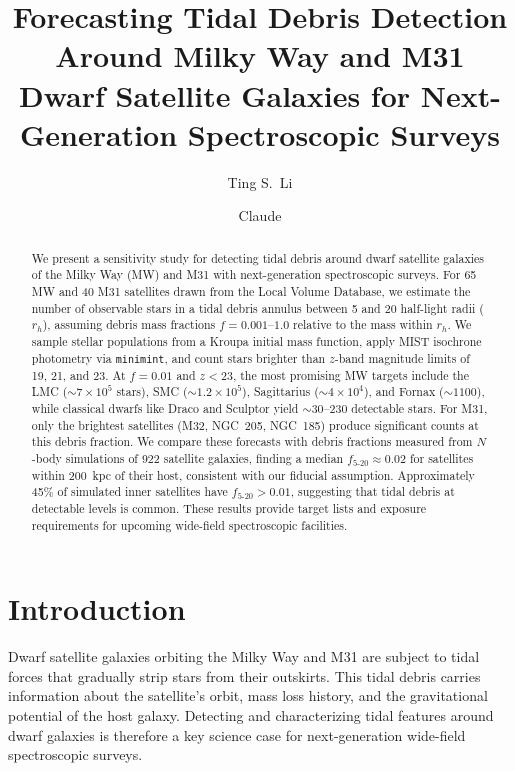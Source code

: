 \documentclass[twocolumn]{aastex63}
\begin{document}
\title{Forecasting Tidal Debris Detection Around Milky Way and M31 Dwarf Satellite Galaxies for Next-Generation Spectroscopic Surveys}

\author{Ting S.\ Li}

\author{Claude}

\begin{abstract}
We present a sensitivity study for detecting tidal debris around dwarf satellite galaxies of the Milky Way (MW) and M31 with next-generation spectroscopic surveys. For 65 MW and 40 M31 satellites drawn from the Local Volume Database, we estimate the number of observable stars in a tidal debris annulus between 5 and 20 half-light radii ($r_h$), assuming debris mass fractions $f = 0.001$--$1.0$ relative to the mass within $r_h$. We sample stellar populations from a Kroupa initial mass function, apply MIST isochrone photometry via \texttt{minimint}, and count stars brighter than $z$-band magnitude limits of 19, 21, and 23. At $f = 0.01$ and $z < 23$, the most promising MW targets include the LMC ($\sim7 \times 10^5$ stars), SMC ($\sim1.2 \times 10^5$), Sagittarius ($\sim4 \times 10^4$), and Fornax ($\sim1100$), while classical dwarfs like Draco and Sculptor yield $\sim$30--230 detectable stars. For M31, only the brightest satellites (M32, NGC~205, NGC~185) produce significant counts at this debris fraction. We compare these forecasts with debris fractions measured from $N$-body simulations of 922 satellite galaxies, finding a median $f_{5\text{-}20} \approx 0.02$ for satellites within 200~kpc of their host, consistent with our fiducial assumption. Approximately 45\% of simulated inner satellites have $f_{5\text{-}20} > 0.01$, suggesting that tidal debris at detectable levels is common. These results provide target lists and exposure requirements for upcoming wide-field spectroscopic facilities.
\end{abstract}


\section{Introduction} \label{sec:intro}

Dwarf satellite galaxies orbiting the Milky Way and M31 are subject to tidal forces that gradually strip stars from their outskirts. This tidal debris carries information about the satellite's orbit, mass loss history, and the gravitational potential of the host galaxy. Detecting and characterizing tidal features around dwarf galaxies is therefore a key science case for next-generation wide-field spectroscopic surveys.
\end{document}
